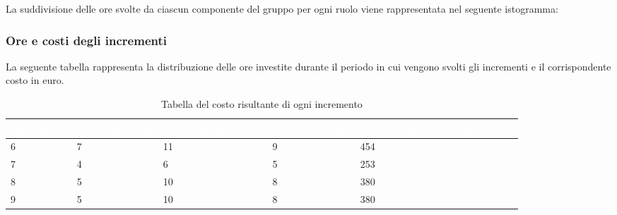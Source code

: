 La suddivisione delle ore svolte da ciascun componente del gruppo per ogni ruolo viene rappresentata nel seguente istogramma:
\begin{center}
	\pgfplotsset{width=17cm, height=8.5cm}
\end{center}
\clearpage

\subsubsection{Ore e costi degli incrementi}
La seguente tabella rappresenta la distribuzione delle ore investite durante il periodo in cui vengono svolti gli incrementi e il corrispondente costo in euro.


{
\renewcommand{\arraystretch}{1.65}
\centering
\begin{longtable}{ C{2.1cm} C{2.7cm} C{3cm} C{3cm} C{3.3cm} }
\caption{Tabella del costo risultante di ogni incremento}\\
\textcolor{white}{\textbf{Incremento}} & 
\textcolor{white}{\textbf{Ore progettista}} &
\textcolor{white}{\textbf{Ore programmatore}}&
\textcolor{white}{\textbf{Ore verificatore}}&
\textcolor{white}{\textbf{Costo totale incremento (in \euro{})}}\\
\endhead



6 & 7 & 11 & 9 & 454\\
7 & 4 & 6  & 5 & 253\\
8 & 5 & 10 & 8 & 380\\
9 & 5 & 10 & 8 & 380\\


\end{longtable}
}

